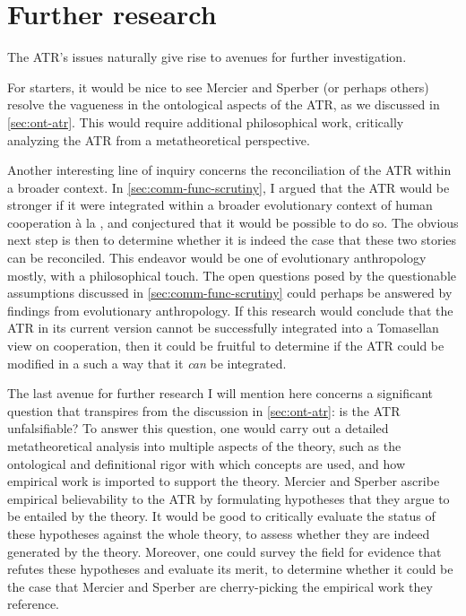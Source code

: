 \section*{Further research}

The ATR's issues naturally give rise to avenues for further investigation.

For starters, it would be nice to see Mercier and Sperber (or perhaps others) resolve the vagueness in the ontological aspects of the ATR, as we discussed in \cref{sec:ont-atr}. This would require additional philosophical work, critically analyzing the ATR from a metatheoretical perspective.

Another interesting line of inquiry concerns the reconciliation of the ATR within a broader context. In \cref{sec:comm-func-scrutiny}, I argued that the ATR would be stronger if it were integrated within a broader evolutionary context of human cooperation à la \citet{Tomasello09}, and conjectured that it would be possible to do so. The obvious next step is then to determine whether it is indeed the case that these two stories can be reconciled. This endeavor would be one of evolutionary anthropology mostly, with a philosophical touch. The open questions posed by the questionable assumptions discussed in \cref{sec:comm-func-scrutiny} could perhaps be answered by findings from evolutionary anthropology.
If this research would conclude that the ATR in its current version cannot be successfully integrated into a Tomasellan view on cooperation, then it could be fruitful to determine if the ATR could be modified in a such a way that it \emph{can} be integrated.

The last avenue for further research I will mention here concerns a significant question that transpires from the discussion in \cref{sec:ont-atr}: is the ATR unfalsifiable?
To answer this question, one would carry out a detailed metatheoretical analysis into multiple aspects of the theory, such as the ontological and definitional rigor with which concepts are used, and how empirical work is imported to support the theory. Mercier and Sperber ascribe empirical believability to the ATR by formulating hypotheses that they argue to be entailed by the theory. It would be good to critically evaluate the status of these hypotheses against the whole theory, to assess whether they are indeed generated by the theory. Moreover, one could survey the field for evidence that refutes these hypotheses and evaluate its merit, to determine whether it could be the case that Mercier and Sperber are cherry-picking the empirical work they reference.

